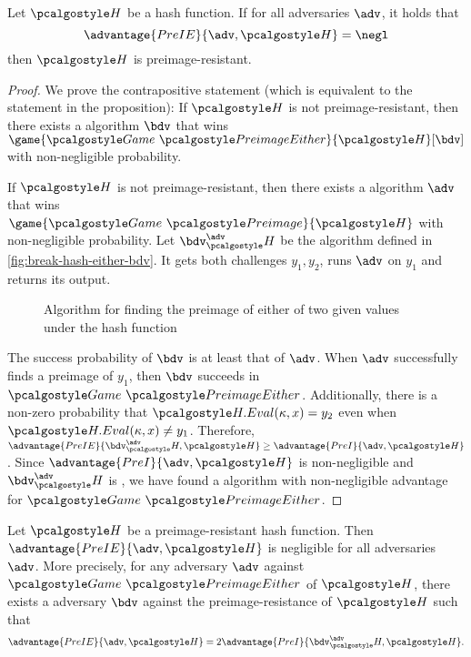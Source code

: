 \begin{proposition}
  Let $\algo{H}$ be a hash function. If for all \ppt adversaries $\adv$, it holds that
  \[
  \advantage{PreIE}{\adv, \algo{H}} = \negl
  \]
  then $\algo{H}$ is preimage-resistant.
\end{proposition}
\begin{proof}
  We prove the contrapositive statement (which is equivalent to the statement in the proposition):
  If $\algo{H}$ is not preimage-resistant, then there exists a \ppt algorithm $\bdv$ that wins $\game{\Game~\algo{PreimageEither}}{\algo{H}}[\bdv]$ with non-negligible probability.

  If $\algo{H}$ is not preimage-resistant, then there exists a \ppt algorithm $\adv$ that wins $\game{\Game~\algo{Preimage}}{\algo{H}}$ with non-negligible probability.
  Let $\bdv^\adv_\algo{H}$ be the algorithm defined in \autoref{fig:break-hash-either-bdv}.
  It gets both challenges $y_1, y_2$, runs $\adv$ on $y_1$ and returns its output.
  \begin{figure}[tbhp]
  \begin{center}
    \begin{tcolorbox}[width=5cm]
      \begin{pchstack}[center]
      \end{pchstack}
    \end{tcolorbox}
  \end{center}
  \caption{Algorithm for finding the preimage of either of two given values under the hash function \label{fig:break-hash-either-bdv}}
  \end{figure}

  The success probability of $\bdv$ is at least that of $\adv$.
  When $\adv$ successfully finds a preimage of $y_1$, then $\bdv$ succeeds in $\Game~\algo{PreimageEither}$.
  Additionally, there is a non-zero probability that $\algo{H.Eval}(\kappa, x) = y_2$ even when $\algo{H.Eval}(\kappa, x) \neq y_1$.
  Therefore, $\advantage{PreIE}{\bdv^\adv_\algo{H}, \algo{H}} \ge \advantage{PreI}{\adv, \algo{H}}$.
  Since $\advantage{PreI}{\adv, \algo{H}}$ is non-negligible and $\bdv^\adv_\algo{H}$ is \ppt, we have found a \ppt algorithm with non-negligible advantage for $\Game~\algo{PreimageEither}$.
\end{proof}

\begin{proposition}\label{prop:preimage-either-reverse}
  Let $\algo{H}$ be a preimage-resistant hash function.
  Then $\advantage{PreIE}{\adv, \algo{H}}$ is negligible for all \ppt adversaries $\adv$.
  More precisely, for any \ppt adversary $\adv$ against $\Game~\algo{PreimageEither}$ of $\algo{H}$, there exists a \ppt adversary $\bdv$ against the preimage-resistance of $\algo{H}$ such that
    \[
    \advantage{PreIE}{\adv, \algo{H}} = 2\advantage{PreI}{\bdv^\adv_\algo{H}, \algo{H}}.
    \]
\end{proposition}

